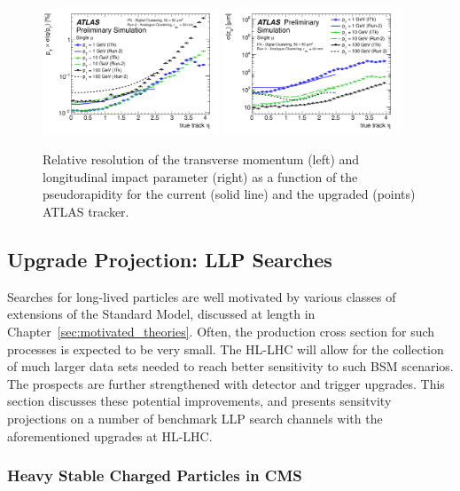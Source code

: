 \begin{figure}[h!tbp]
\begin{center}
  \includegraphics[width=0.47\textwidth]{figures/ch03_fig_006e.png}
  \includegraphics[width=0.47\textwidth]{figures/ch03_fig_006b.png}
  \caption{Relative resolution of the transverse momentum (left) and longitudinal impact parameter (right) as a function of the pseudorapidity for the current (solid line) and the upgraded (points) ATLAS tracker.}
  \label{fig:atlastrackres}
\end{center}
\end{figure}

\subsection{Upgrade Projection: LLP Searches} \label{sec:upgradesearch}

Searches for long-lived particles are well motivated by various classes of extensions of the Standard Model, discussed at length in Chapter~\ref{sec:motivated_theories}. Often, the production cross section for such processes is expected to be very small. The HL-LHC will allow for the collection of much larger data sets needed to reach better sensitivity to such BSM scenarios. The prospects are further strengthened with detector and trigger upgrades. This section discusses these potential improvements, and presents sensitvity projections on a number of benchmark LLP search channels with the aforementioned upgrades at HL-LHC.

\subsubsection{Heavy Stable Charged Particles in CMS}

